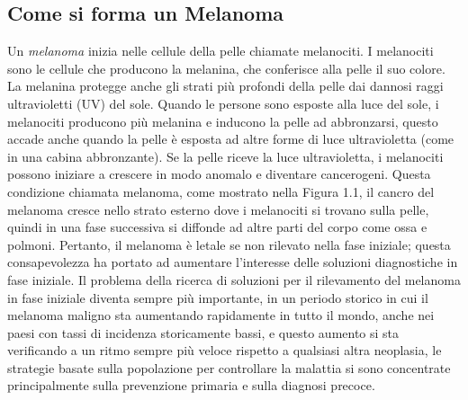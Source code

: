 {\subsection{Come si forma un Melanoma}
Un \textit{melanoma} inizia nelle cellule della pelle chiamate melanociti. I melanociti sono le cellule che producono la melanina, che conferisce alla pelle il suo colore. La melanina protegge anche gli strati più profondi della pelle dai dannosi raggi ultravioletti (UV) del sole. Quando le persone sono esposte alla luce del sole, i melanociti producono più melanina e inducono la pelle ad abbronzarsi, questo accade anche quando la pelle è esposta ad altre forme di luce ultravioletta (come in una cabina abbronzante). 
\newline
Se la pelle riceve la luce ultravioletta, i melanociti possono iniziare a crescere in modo anomalo e diventare cancerogeni. Questa condizione chiamata melanoma, come mostrato nella Figura 1.1, il cancro del melanoma cresce nello strato esterno dove i melanociti si trovano sulla pelle, quindi in una fase successiva si diffonde ad altre parti del corpo come ossa e polmoni.
\newline
Pertanto, il melanoma è letale se non rilevato nella fase iniziale; questa consapevolezza ha portato ad aumentare l'interesse delle soluzioni diagnostiche in fase iniziale.
Il problema della ricerca di soluzioni per il rilevamento del melanoma in fase iniziale diventa sempre più importante, in un periodo storico in cui il melanoma maligno sta aumentando rapidamente in tutto il mondo, anche nei paesi con tassi di incidenza storicamente bassi, e questo aumento si sta verificando a un ritmo sempre più veloce rispetto a qualsiasi altra neoplasia, le strategie basate sulla popolazione per controllare la malattia si sono concentrate principalmente sulla prevenzione primaria e sulla diagnosi precoce.
}
